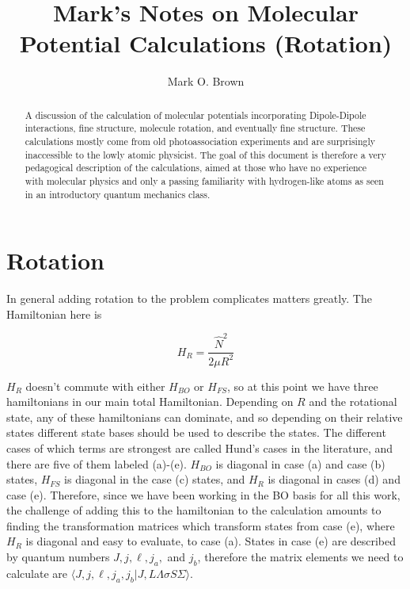 \documentclass[prl, longbibliography, aps, 10pt]{revtex4-2}
\begin{document}
\title{Mark's Notes on Molecular Potential Calculations (Rotation)}
\author{Mark O. Brown}

\begin{abstract}
A discussion of the calculation of molecular potentials incorporating Dipole-Dipole interactions, fine structure, molecule rotation, and eventually fine structure. These calculations mostly come from old photoassociation experiments and are surprisingly inaccessible to the lowly atomic physicist. The goal of this document is therefore a very pedagogical description of the calculations, aimed at those who have no experience with molecular physics and only a passing familiarity with hydrogen-like atoms as seen in an introductory quantum mechanics class. 
\end{abstract}

\maketitle

\section{Rotation}

In general adding rotation to the problem complicates matters greatly. The Hamiltonian here is

\begin{equation}
H_R = \frac{\hat{N}^2}{2\mu R^2}
\end{equation}

$H_R$ doesn't commute with either $H_{BO}$ or $H_{FS}$, so at this point we have three hamiltonians in our main total Hamiltonian. Depending on $R$ and the rotational state, any of these hamiltonians can dominate, and so depending on their relative states different state bases should be used to describe the states. The different cases of which terms are strongest are called Hund's cases in the literature, and there are five of them labeled (a)-(e). $H_{BO}$ is diagonal in case (a) and case (b) states, $H_{FS}$ is diagonal in the case (c) states, and $H_R$ is diagonal in cases (d) and case (e). Therefore, since we have been working in the BO basis for all this work, the challenge of adding this to the hamiltonian to the calculation amounts to finding the transformation matrices which transform states from case (e), where $H_R$ is diagonal and easy to evaluate, to case (a). States in case (e) are described by quantum numbers $J, j, \ell, j_a, $ and $j_b$, therefore the matrix elements we need to calculate are $\langle J, j, \ell, j_a, j_b|J, L\Lambda\sigma S \Sigma\rangle$.
\end{document}
